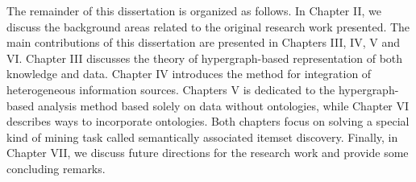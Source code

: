The remainder of this dissertation is organized as follows. In Chapter II, we discuss the background areas related to the original research work presented. The main contributions of this dissertation are presented in Chapters III, IV, V and VI. Chapter III discusses the theory of hypergraph-based representation of both knowledge and data. Chapter IV introduces the method for integration of heterogeneous information sources. Chapters V is dedicated to the hypergraph-based analysis method based solely on data without ontologies, while Chapter VI describes ways to incorporate ontologies. Both chapters focus on solving a special kind of mining task called semantically associated itemset discovery. Finally, in Chapter VII, we discuss future directions for the research work and provide some concluding remarks.











